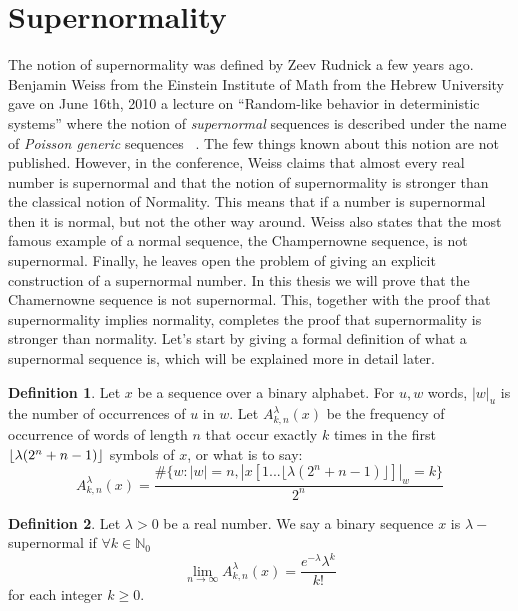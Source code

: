 \documentclass[11pt,a4paper]{tesis}
\theoremstyle{definition}
\newtheorem{definition}{Definition}[section]
\DeclarePairedDelimiter{\floor}{\lfloor}{\rfloor}
\begin{document}
\section{Supernormality}

    

The notion of supernormality was defined by Zeev Rudnick a few years ago. Benjamin Weiss from the Einstein Institute of Math from the Hebrew University gave on June 16th, 2010 a lecture on “Random-like behavior in deterministic systems”  where the notion of \textit{supernormal} sequences is described under the name of \textit{Poisson generic} sequences ~\cite{Weiss}.
 The few things known about this notion are not published. However, in the conference, Weiss claims that almost every real number is supernormal and that the notion of supernormality is stronger than the classical notion of Normality. This means that if a number is supernormal then it is normal, but not the other way around. 
Weiss also states that the most famous example of a normal sequence, the Champernowne sequence, is not supernormal.
Finally, he leaves open the problem of giving an explicit construction of a supernormal number.
In this thesis we will prove that the Chamernowne sequence is not supernormal. This, together with the proof that supernormality implies normality, completes the proof that supernormality is stronger than normality.
Let's start by giving a formal definition of what a supernormal sequence is, which will be explained more in detail later.
\\


\begin{definition}
Let $x$ be a sequence over a binary alphabet.
For $u,w$ words, $|w|_u$ is the number of occurrences of $u$ in $w$.
Let $A^\lambda_{k,n}(x)$ be the frequency of occurrence of words of length $n$ that occur exactly $k$ times in the first $\floor{\lambda(2^n+n-1)}$ symbols of $x$, or what is to say:
$$A^\lambda_{k,n}(x) = \frac{\#\{w: |w| = n  , |x[1...\lfloor\lambda(2^n+n-1)\rfloor]|_w = k\}}{2^n}$$
\end{definition}


\begin{definition}
    Let $\lambda > 0$ be a real number. We say a binary sequence $x$ is $\lambda-$supernormal if $\forall k \in \mathds{N}_{0}$ $$\lim_{n\to\infty} A^\lambda_{k,n}(x) = \frac{e^{-\lambda}\lambda^k}{k!}$$ for each integer $k \geq 0$.
\end{definition}
\end{document}
